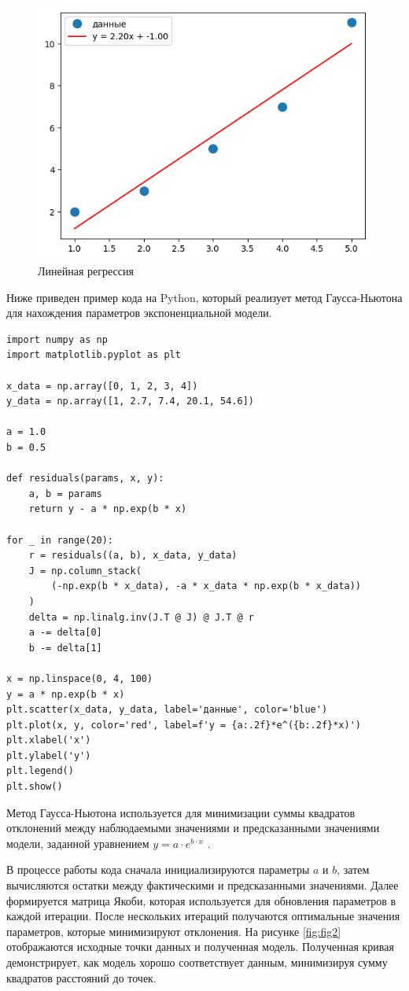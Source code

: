 \documentclass[11pt,a4paper]{article}
\begin{document}
\begin{figure}[H]
    \centering
    \includegraphics[width=0.75\linewidth]{OLS-example-np-lstsq.png}
    \caption{Линейная регрессия}
    \label{fig:fig1}
\end{figure}

Ниже приведен пример кода на Python, который реализует метод Гаусса-Ньютона для нахождения параметров экспоненциальной модели.

\begin{verbatim}
import numpy as np
import matplotlib.pyplot as plt

x_data = np.array([0, 1, 2, 3, 4])
y_data = np.array([1, 2.7, 7.4, 20.1, 54.6])

a = 1.0
b = 0.5

def residuals(params, x, y):
    a, b = params
    return y - a * np.exp(b * x)

for _ in range(20):
    r = residuals((a, b), x_data, y_data)
    J = np.column_stack(
        (-np.exp(b * x_data), -a * x_data * np.exp(b * x_data))
    )
    delta = np.linalg.inv(J.T @ J) @ J.T @ r
    a -= delta[0]
    b -= delta[1]

x = np.linspace(0, 4, 100)
y = a * np.exp(b * x)
plt.scatter(x_data, y_data, label='данные', color='blue')
plt.plot(x, y, color='red', label=f'y = {a:.2f}*e^({b:.2f}*x)')
plt.xlabel('x')
plt.ylabel('y')
plt.legend()
plt.show()
\end{verbatim}

Метод Гаусса-Ньютона используется для минимизации суммы квадратов отклонений между наблюдаемыми значениями и предсказанными значениями модели, заданной уравнением  
$y = a \cdot e^{b \cdot x}$ . 

В процессе работы кода сначала инициализируются параметры $a$  и  $b$, затем вычисляются остатки между фактическими и предсказанными значениями. Далее формируется матрица Якоби, которая используется для обновления параметров в каждой итерации. После нескольких итераций получаются оптимальные значения параметров, которые минимизируют отклонения.
На рисунке \ref{fig:fig2} отображаются исходные точки данных и полученная модель. Полученная кривая демонстрирует, как модель хорошо соответствует данным, минимизируя сумму квадратов расстояний до точек.
\end{document}
